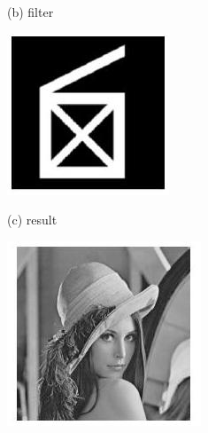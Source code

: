 \documentclass[10pt]{article}
\begin{document}
(b) filter

\includegraphics[max width=\textwidth]{2022_01_06_b5ce182ed1bd5f482e5bg-19(2)}

(c) result

\includegraphics[max width=\textwidth]{2022_01_06_b5ce182ed1bd5f482e5bg-19(3)}
\end{document}
